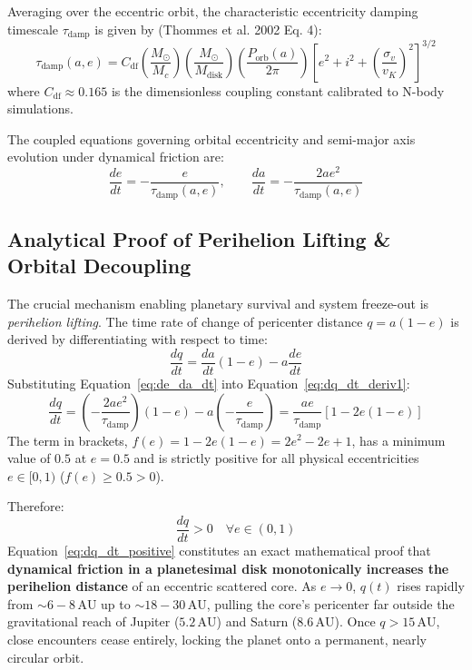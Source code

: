 \documentclass[11pt,a4paper]{article}
\begin{document}
Averaging over the eccentric orbit, the characteristic eccentricity damping timescale $\tau_{\text{damp}}$ is given by (Thommes et al. 2002 Eq. 4):
\begin{equation}
\tau_{\text{damp}}(a, e) = C_{\text{df}} \left(\frac{M_\odot}{M_c}\right) \left(\frac{M_\odot}{M_{\text{disk}}}\right) \left(\frac{P_{\text{orb}}(a)}{2\pi}\right) \left[ e^2 + i^2 + \left(\frac{\sigma_v}{v_K}\right)^2 \right]^{3/2}
\label{eq:tau_damp}
\end{equation}
where $C_{\text{df}} \approx 0.165$ is the dimensionless coupling constant calibrated to N-body simulations.

The coupled equations governing orbital eccentricity and semi-major axis evolution under dynamical friction are:
\begin{equation}
\frac{de}{dt} = -\frac{e}{\tau_{\text{damp}}(a, e)}, \qquad \frac{da}{dt} = -\frac{2 a e^2}{\tau_{\text{damp}}(a, e)}
\label{eq:de_da_dt}
\end{equation}

\subsection{Analytical Proof of Perihelion Lifting \& Orbital Decoupling}
The crucial mechanism enabling planetary survival and system freeze-out is \textit{perihelion lifting}. The time rate of change of pericenter distance $q = a(1-e)$ is derived by differentiating with respect to time:
\begin{equation}
\frac{dq}{dt} = \frac{da}{dt}(1 - e) - a \frac{de}{dt}
\label{eq:dq_dt_deriv1}
\end{equation}
Substituting Equation~\eqref{eq:de_da_dt} into Equation~\eqref{eq:dq_dt_deriv1}:
\begin{equation}
\frac{dq}{dt} = \left(-\frac{2 a e^2}{\tau_{\text{damp}}}\right)(1 - e) - a \left(-\frac{e}{\tau_{\text{damp}}}\right) = \frac{a e}{\tau_{\text{damp}}} \left[ 1 - 2e(1 - e) \right]
\label{eq:dq_dt_exact}
\end{equation}
The term in brackets, $f(e) = 1 - 2e(1-e) = 2e^2 - 2e + 1$, has a minimum value of $0.5$ at $e = 0.5$ and is strictly positive for all physical eccentricities $e \in [0, 1)$ ($f(e) \ge 0.5 > 0$).

Therefore:
\begin{equation}
\frac{dq}{dt} > 0 \quad \forall e \in (0, 1)
\label{eq:dq_dt_positive}
\end{equation}
Equation~\eqref{eq:dq_dt_positive} constitutes an exact mathematical proof that \textbf{dynamical friction in a planetesimal disk monotonically increases the perihelion distance} of an eccentric scattered core. As $e \to 0$, $q(t)$ rises rapidly from $\sim 6-8\,\text{AU}$ up to $\sim 18-30\,\text{AU}$, pulling the core's pericenter far outside the gravitational reach of Jupiter ($5.2\,\text{AU}$) and Saturn ($8.6\,\text{AU}$). Once $q > 15\,\text{AU}$, close encounters cease entirely, locking the planet onto a permanent, nearly circular orbit.
\end{document}
